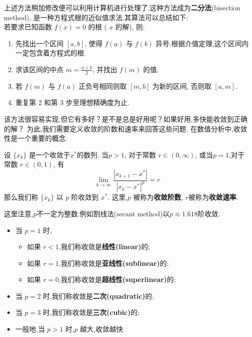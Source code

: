 上述方法稍加修改便可以利用计算机进行处理了,这种方法成为\textbf{二分法}(bisection method),
是一种方程式根的近似值求法.其算法可以总结如下:
\\
若要求已知函数 $f(x)=0$ 的根 ( $x$ 的解), 则:
\begin{enumerate}
    \item  先找出一个区间 $[a, b]$, 使得 $f(a)$ 与 $f(b)$ 异号.根据介值定理,这个区间内一定包含着方程式的根.
    \item  求该区间的中点 $m=\frac{a+b}{2}$, 并找出 $f(m)$ 的值.
    \item  若 $f(m)$ 与 $f(a)$ 正负号相同则取 $[m, b]$ 为新的区间, 否则取 $[a, m]$.
    \item  重复第 2 和第 3 步至理想精确度为止.
\end{enumerate}
该方法很容易实现,但它有多好？是不是总是好用呢？如果好用,多快能收敛到正确的解？
为此,我们需要定义收敛的阶数和速率来回答这些问题.
在数值分析中,收敛性是一个重要的概念.

\begin{definition}
    设 $\{x_k\}$ 是一个收敛于$x^*$的数列.
    当$p>1$, 对于常数 $r\in (0, \infty)$, 
    或当$p=1$,对于常数 $r\in (0, 1)$, 
    有
\begin{equation}
    \lim_{k\to \infty} \frac{|x_{k+1} - x^*| } {|x_k - x^*|^p} = r
\end{equation}
那么我们称 $\{x_k\}$ 以 $p$ 阶收敛到 $x^*$.
这里,$p$ 被称为\textbf{收敛阶数}, $r$被称为\textbf{收敛速率}.
\end{definition}
这里注意,$p$不一定为整数.例如割线法(secant method)以$p\approx 1.618$阶收敛.
\begin{itemize}
    \item 当 $p = 1$ 时,
        \begin{itemize}
            \item 如果 $r < 1$,我们称收敛是\textbf{线性(linear)}的;
            \item 如果 $r = 1$,我们称收敛是\textbf{亚线性(sublinear)}的;
            \item 如果 $r = 0$,我们称收敛是\textbf{超线性(superlinear)}的;
        \end{itemize}
    \item 当 $p = 2$ 时,我们称收敛是\textbf{二次(quadratic)}的;
    \item 当 $p = 3$ 时,我们称收敛是\textbf{三次(cubic)}的;
    \item 一般地,当 $p > 1$ 时,$p$ 越大,收敛越快.
\end{itemize}

